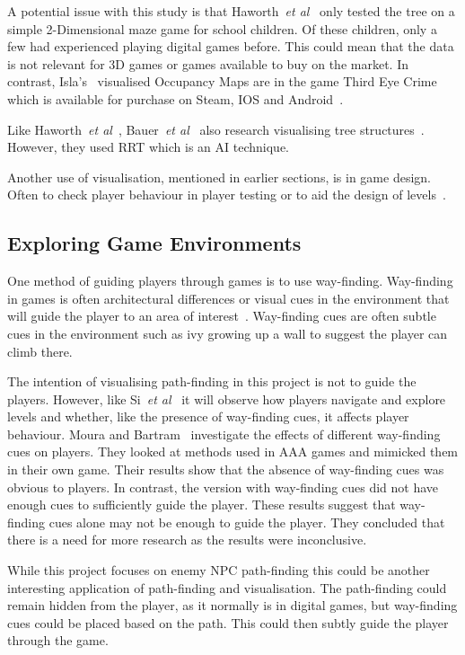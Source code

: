 \documentclass[journal]{IEEEtran}
\begin{document}
	A potential issue with this study is that Haworth~\textit{et al}~\cite{Haworth2010} only tested the tree on a simple 2-Dimensional maze game for school children. Of these children, only a few had experienced playing digital games before.  This could mean that the data is not relevant for 3D games or games available to buy on the market.  In contrast, Isla's~\cite{Isla2014} visualised Occupancy Maps are in the game Third Eye Crime which is available for purchase on Steam, IOS and Android~\cite{Isla2014, game:ThirdEyeCrime}.
	
	Like Haworth~\textit{et al}~\cite{Haworth2010}, Bauer~\textit{et al}~\cite{bauer2012} also research visualising tree structures~\cite{bauer2012}. However, they used RRT which is an AI technique.
	
	Another use of visualisation, mentioned in earlier sections, is in game design. Often to check player behaviour in player testing or to aid the design of levels~\cite{Nelson2011,bauer2012, Tremblay2013, Tremblay2014}. 
	
	\subsection{Exploring Game Environments} \label{Exploring}
	One method of guiding players through games is to use way-finding. Way-finding in games is often architectural differences or visual cues in the environment that will guide the player to an area of interest~\cite{si2017, Bacim2008}. Way-finding cues are often subtle cues in the environment such as ivy growing up a wall to suggest the player can climb there.
	
	The intention of visualising path-finding in this project is not to guide the players. However, like Si~\textit{et al}~\cite{si2017} it will observe how players navigate and explore levels and whether, like the presence of way-finding cues, it affects player behaviour. 
	Moura and Bartram~\cite{moura2014} investigate the effects of different way-finding cues on players. They looked at methods used in AAA games and mimicked them in their own game. Their results show that the absence of way-finding cues was obvious to players. In contrast, the version with way-finding cues did not have enough cues to sufficiently guide the player. These results suggest that way-finding cues alone may not be enough to guide the player. They concluded that there is a need for more research as the results were inconclusive. 
	
	While this project focuses on enemy NPC path-finding this could be another interesting application of path-finding and visualisation. The path-finding could remain hidden from the player, as it normally is in digital games, but way-finding cues could be placed based on the path. This could then subtly guide the player through the game.
	
\end{document}
